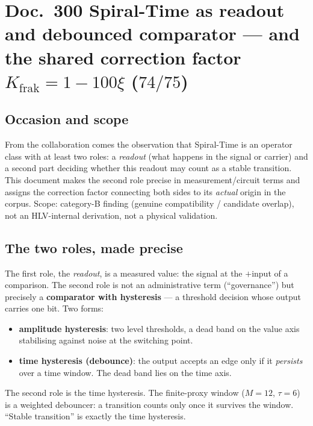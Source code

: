 
\section*{Doc.~300 \quad Spiral-Time as readout and debounced comparator ---
and the shared correction factor $K_{\text{frak}} = 1-100\xi$ ($74/75$)}

\subsection*{Occasion and scope}

From the collaboration comes the observation that Spiral-Time is an operator
class with at least two roles: a \emph{readout} (what happens in the signal or
carrier) and a second part deciding whether this readout may count as a stable
transition. This document makes the second role precise in measurement/circuit
terms and assigns the correction factor connecting both sides to its
\emph{actual} origin in the corpus. Scope: category-B finding (genuine
compatibility / candidate overlap), not an HLV-internal derivation, not a
physical validation.

\subsection*{The two roles, made precise}

The first role, the \emph{readout}, is a measured value: the signal at the
$+$input of a comparison. The second role is not an administrative term
(\enquote{governance}) but precisely a \textbf{comparator with hysteresis} ---
a threshold decision whose output carries one bit. Two forms:
\begin{itemize}
  \item \textbf{amplitude hysteresis}: two level thresholds, a dead band on the
    value axis stabilising against noise at the switching point.
  \item \textbf{time hysteresis (debounce)}: the output accepts an edge only if
    it \emph{persists} over a time window. The dead band lies on the time axis.
\end{itemize}
The second role is the time hysteresis. The finite-proxy window ($M=12$,
$\tau=6$) is a weighted debouncer: a transition counts only once it survives
the window. \enquote{Stable transition} is exactly the time hysteresis.

